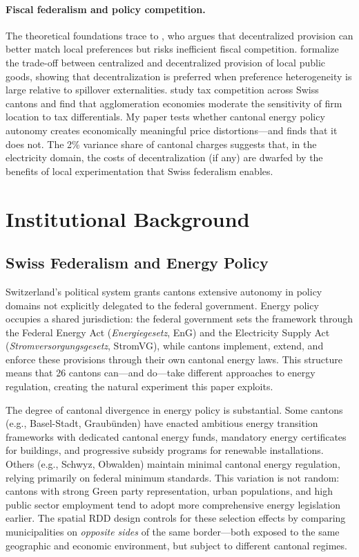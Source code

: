 \documentclass[12pt]{article}
\begin{document}
\paragraph{Fiscal federalism and policy competition.} The theoretical foundations trace to \citet{oates1972fiscal}, who argues that decentralized provision can better match local preferences but risks inefficient fiscal competition. \citet{besley2003centralized} formalize the trade-off between centralized and decentralized provision of local public goods, showing that decentralization is preferred when preference heterogeneity is large relative to spillover externalities. \citet{brulhart2015cohesion} study tax competition across Swiss cantons and find that agglomeration economies moderate the sensitivity of firm location to tax differentials. My paper tests whether cantonal energy policy autonomy creates economically meaningful price distortions---and finds that it does not. The 2\% variance share of cantonal charges suggests that, in the electricity domain, the costs of decentralization (if any) are dwarfed by the benefits of local experimentation that Swiss federalism enables.


\section{Institutional Background}

\subsection{Swiss Federalism and Energy Policy}

Switzerland's political system grants cantons extensive autonomy in policy domains not explicitly delegated to the federal government. Energy policy occupies a shared jurisdiction: the federal government sets the framework through the Federal Energy Act (\textit{Energiegesetz}, EnG) and the Electricity Supply Act (\textit{Stromversorgungsgesetz}, StromVG), while cantons implement, extend, and enforce these provisions through their own cantonal energy laws. This structure means that 26 cantons can---and do---take different approaches to energy regulation, creating the natural experiment this paper exploits.

The degree of cantonal divergence in energy policy is substantial. Some cantons (e.g., Basel-Stadt, Graubünden) have enacted ambitious energy transition frameworks with dedicated cantonal energy funds, mandatory energy certificates for buildings, and progressive subsidy programs for renewable installations. Others (e.g., Schwyz, Obwalden) maintain minimal cantonal energy regulation, relying primarily on federal minimum standards. This variation is not random: cantons with strong Green party representation, urban populations, and high public sector employment tend to adopt more comprehensive energy legislation earlier. The spatial RDD design controls for these selection effects by comparing municipalities on \textit{opposite sides} of the same border---both exposed to the same geographic and economic environment, but subject to different cantonal regimes.
\end{document}
